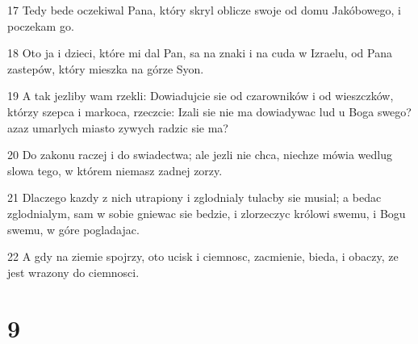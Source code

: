 \par 17 Tedy bede oczekiwal Pana, który skryl oblicze swoje od domu Jakóbowego, i poczekam go.
\par 18 Oto ja i dzieci, które mi dal Pan, sa na znaki i na cuda w Izraelu, od Pana zastepów, który mieszka na górze Syon.
\par 19 A tak jezliby wam rzekli: Dowiadujcie sie od czarowników i od wieszczków, którzy szepca i markoca, rzeczcie: Izali sie nie ma dowiadywac lud u Boga swego? azaz umarlych miasto zywych radzic sie ma?
\par 20 Do zakonu raczej i do swiadectwa; ale jezli nie chca, niechze mówia wedlug slowa tego, w którem niemasz zadnej zorzy.
\par 21 Dlaczego kazdy z nich utrapiony i zglodnialy tulacby sie musial; a bedac zglodnialym, sam w sobie gniewac sie bedzie, i zlorzeczyc królowi swemu, i Bogu swemu, w góre pogladajac.
\par 22 A gdy na ziemie spojrzy, oto ucisk i ciemnosc, zacmienie, bieda, i obaczy, ze jest wrazony do ciemnosci.

\chapter{9}

